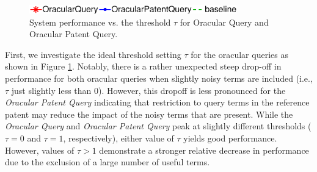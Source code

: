 \begin{figure}[t!]
\begin{centering}
\includegraphics[width=9cm]{imgs/l1}
\par\end{centering}

\begin{centering}
\par\end{centering}

\protect\caption{System performance vs. the threshold $\tau$ for Oracular Query and Oracular Patent Query.}
\label{fig:oracular}
\end{figure}

First, we investigate the ideal threshold setting $\tau$ for the
oracular queries as shown in Figure \ref{fig:oracular}.  Notably,
there is a rather unexpected steep drop-off in performance for both
oracular queries when slightly noisy terms are included
(i.e., $\tau$ just slightly less than 0).  However, this dropoff is
less pronounced for the
\emph{Oracular Patent Query} indicating that restriction to query terms in the
reference patent may reduce the impact of the noisy terms that are present.
While the \emph{Oracular Query} and \emph{Oracular Patent Query} peak
at slightly different thresholds ($\tau = 0$ and $\tau = 1$, respectively), 
either value of $\tau$ yields good performance.
However, values of $\tau > 1$
demonstrate a stronger relative decrease in performance due to the exclusion 
of a large number of useful terms.

